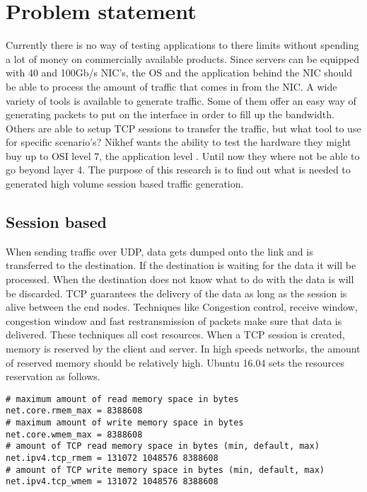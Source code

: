 \chapter{Problem statement}\label{ch:problem}
Currently there is no way of testing applications to there limits without spending a lot of money on commercially available products. 
Since servers can be equipped with 40 and 100Gb/s NIC's, the OS and the application behind the NIC should be able to process the amount of traffic that comes in from the NIC. 
A wide variety of tools is available to generate traffic. Some of them offer an easy way of generating packets to put on the interface in order to fill up the bandwidth. 
Others are able to setup TCP sessions to transfer the traffic, but what tool to use for specific scenario's?   
Nikhef wants the ability to test the hardware they might buy up to OSI level 7, the application level . Until now they where not be able to go beyond layer 4. The purpose of this research is to find out what is needed to generated high volume session based traffic generation.

\section{Session based}\label{sec:sessionbased}
When sending traffic over UDP, data gets dumped onto the link and is transferred to the destination. If the destination is waiting for the data it will be processed.
When the destination does not know what to do with the data is will be discarded. TCP guarantees the delivery of the data as long as the session is alive between the end nodes.
Techniques like Congestion control, receive window, congestion window and fast restransmission of packets make sure that data is delivered. These techniques all cost resources. 
When a TCP session is created, memory is reserved by the client and server. In high speeds networks, the amount of reserved memory should be relatively high. 
Ubuntu 16.04 sets the resources reservation as follows.

\begin{verbatim}
# maximum amount of read memory space in bytes
net.core.rmem_max = 8388608
# maximum amount of write memory space in bytes
net.core.wmem_max = 8388608
# amount of TCP read memory space in bytes (min, default, max)
net.ipv4.tcp_rmem = 131072 1048576 8388608
# amount of TCP write memory space in bytes (min, default, max)
net.ipv4.tcp_wmem = 131072 1048576 8388608
\end{verbatim}  

